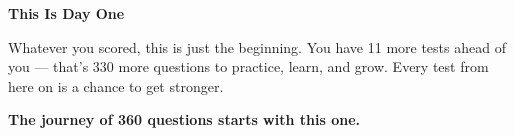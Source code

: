 {\begin{tcolorbox}[
    enhanced,
    colback=funGreenLight,
    colframe=funGreen!50,
    arc=10pt,
    boxrule=1pt,
    left=6mm, right=6mm, top=4mm, bottom=4mm,
]
{\bfseries\color{funGreenDark} \faSeedling\hspace{2mm}This Is Day One}

\vspace{2mm}

Whatever you scored, this is just the beginning. You have 11 more tests ahead of you — that's 330 more questions to practice, learn, and grow. Every test from here on is a chance to get stronger.
\end{tcolorbox}

\vspace{4mm}

\begin{center}
{\large\bfseries\color{funBlueDark} \faRoad\hspace{2mm}The journey of 360 questions starts with this one.\hspace{2mm}\faRoad}
\end{center}

}
\newpage
